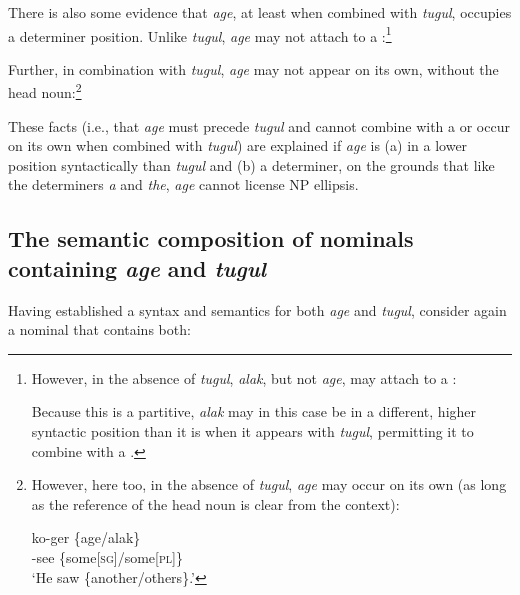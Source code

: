 \documentclass[output=paper]{LSP/langsci}
\begin{document}
There is also some evidence that \textit{age}, at least when combined with \textit{tugul}, occupies a determiner position. Unlike \textit{tugul}, \textit{age} may not attach to a :\footnote{However, in the absence of \textit{tugul}, \textit{alak}, but not \textit{age}, may attach to a :

\z 

 \noindent Because this is a partitive, \textit{alak} may in this case be in a different, higher syntactic position than it is when it appears with \textit{tugul}, permitting it to combine with a .}

\z

\noindent Further, in combination with \textit{tugul}, \textit{age} may not appear on its own, without the head noun:\footnote{However, here too, in the absence of \textit{tugul}, \textit{age} may occur on its own (as long as the reference of the head noun is clear from the context):

\ea\label{ex:agetugulonown}
    \gll ko-ger \{age/alak\}\\ 
	     \pst-see \{some[\textsc{sg}]/some[\textsc{pl}]\} \\
     \glt ‘He saw \{another/others\}.’   
     \z }

\z 

These facts (i.e., that \textit{age} must precede \textit{tugul} and cannot combine with a  or occur on its own when combined with \textit{tugul}) are explained if \textit{age} is (a) in a lower position syntactically than \textit{tugul} and (b) a determiner, on the grounds that like the  determiners \textit{a} and \textit{the}, \textit{age} cannot license NP ellipsis.

\subsection{The semantic composition of nominals containing \textit{age} and \textit{tugul}}
Having established a syntax and semantics for both \textit{age} and \textit{tugul}, consider again a nominal that contains both:
\end{document}
